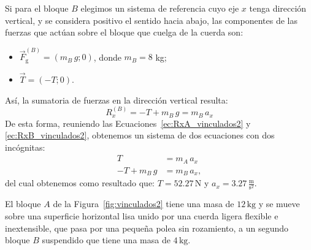 \documentclass[addpoints]{exam}
\newcommand{\un}[1]{\text{#1}}
\begin{document}
\begin{questions}
\begin{solution}
        Si para el bloque $B$ elegimos un sistema de referencia cuyo eje $x$ tenga dirección vertical, y se considera positivo el sentido hacia abajo, las componentes de las fuerzas que actúan sobre el bloque que cuelga de la cuerda son:
        \begin{itemize}
            \item $\vec{F}_\text{g}^{(B)} = \left( m_B \, g; 0\right)$, donde $m_B = 8$ kg;
            \item $\vec{T} = (-T;0)$.
        \end{itemize}
        Así, la sumatoria de fuerzas en la dirección vertical resulta: 
        \begin{equation}
            \label{ec:RxB_vinculados2}
            R_x^{(B)} =  - T + m_B \, g = m_B \, a_x
        \end{equation} De esta forma, reuniendo las Ecuaciones~\eqref{ec:RxA_vinculados2} y \eqref{ec:RxB_vinculados2}, obtenemos un sistema de dos ecuaciones con dos incógnitas:
        \begin{align*}
                    T &= m_A \, a_x \\
            - T + m_B \, g &= m_B \, a_x,
        \end{align*} del cual obtenemos como resultado que: $T = 52.27 \, \text{N}$ y $a_x = 3.27 \, \frac{\text{m}}{\text{s}^2}$.
    \end{solution}

    \question El bloque $A$ de la Figura~\ref{fig:vinculados2} tiene una masa de $12 \, \un{kg}$ y se mueve sobre una superficie horizontal lisa unido por una cuerda ligera flexible e inextensible, que pasa por una pequeña polea sin rozamiento, a un segundo bloque $B$ suspendido que tiene una masa de $4 \, \un{kg}$.



\end{questions}
\end{document}
